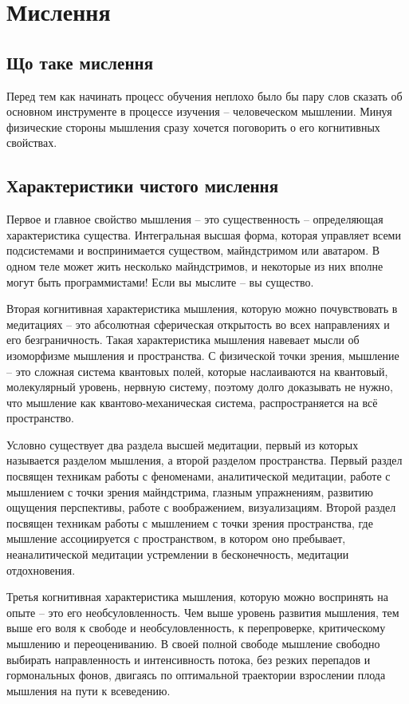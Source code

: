 \section{Мислення}

\subsection{Що таке мислення}

Перед тем как начинать процесс обучения неплохо было бы пару слов сказать об основном инструменте в процессе изучения – человеческом мышлении. Минуя физические стороны мышления сразу хочется поговорить о его когнитивных свойствах.

\subsection{Характеристики чистого мислення}

Первое и главное свойство мышления – это существенность -- определяющая характеристика существа. Интегральная высшая форма, которая управляет всеми подсистемами и воспринимается существом, майндстримом или аватаром. В одном теле может жить несколько майндстримов, и некоторые из них вполне могут быть программистами! Если вы мыслите – вы существо.

Вторая когнитивная характеристика мышления, которую можно почувствовать в медитациях – это абсолютная сферическая открытость во всех направлениях и его безграничность. Такая характеристика мышления навевает мысли об изоморфизме мышления и пространства. С физической точки зрения, мышление – это сложная система квантовых полей, которые наслаиваются на квантовый, молекулярный уровень, нервную систему, поэтому долго доказывать не нужно, что мышление как квантово-механическая система, распространяется на всё пространство.

Условно существует два раздела высшей медитации, первый из которых называется разделом мышления, а второй разделом пространства. Первый раздел посвящен техникам работы с феноменами, аналитической медитации, работе с мышлением с точки зрения майндстрима, глазным упражнениям, развитию ощущения перспективы, работе с воображением, визуализациям. Второй раздел посвящен техникам работы с мышлением с точки зрения пространства, где мышление ассоциируется с пространством, в котором оно пребывает, неаналитической медитации устремлении в бесконечность, медитации отдохновения.

Третья когнитивная характеристика мышления, которую можно воспринять на опыте – это его необсуловленность. Чем выше уровень развития мышления, тем выше его воля к свободе и необсуловленность, к перепроверке, критическому мышлению и переоцениванию. В своей полной свободе мышление свободно выбирать направленность и интенсивность потока, без резких перепадов и гормональных фонов, двигаясь по оптимальной траектории взрослении плода мышления на пути к всеведению.

